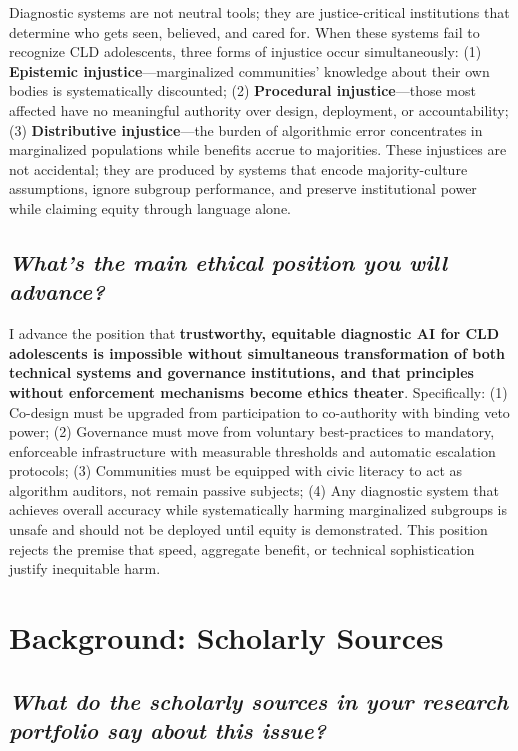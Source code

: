 \documentclass[12pt,a4paper]{article}
\begin{document}
Diagnostic systems are not neutral tools; they are justice-critical institutions that determine who gets seen, believed, and cared for. When these systems fail to recognize CLD adolescents, three forms of injustice occur simultaneously: (1) \textbf{Epistemic injustice}—marginalized communities' knowledge about their own bodies is systematically discounted; (2) \textbf{Procedural injustice}—those most affected have no meaningful authority over design, deployment, or accountability; (3) \textbf{Distributive injustice}—the burden of algorithmic error concentrates in marginalized populations while benefits accrue to majorities. These injustices are not accidental; they are produced by systems that encode majority-culture assumptions, ignore subgroup performance, and preserve institutional power while claiming equity through language alone.

\subsection*{\textit{What's the main ethical position you will advance?}}

I advance the position that \textbf{trustworthy, equitable diagnostic AI for CLD adolescents is impossible without simultaneous transformation of both technical systems and governance institutions, and that principles without enforcement mechanisms become ethics theater}. Specifically: (1) Co-design must be upgraded from participation to co-authority with binding veto power; (2) Governance must move from voluntary best-practices to mandatory, enforceable infrastructure with measurable thresholds and automatic escalation protocols; (3) Communities must be equipped with civic literacy to act as algorithm auditors, not remain passive subjects; (4) Any diagnostic system that achieves overall accuracy while systematically harming marginalized subgroups is unsafe and should not be deployed until equity is demonstrated. This position rejects the premise that speed, aggregate benefit, or technical sophistication justify inequitable harm.

\section{Background: Scholarly Sources}

\subsection*{\textit{What do the scholarly sources in your research portfolio say about this issue?}}
\end{document}

